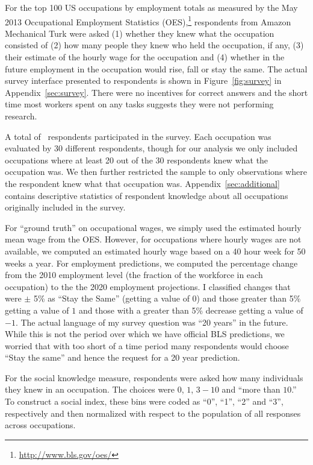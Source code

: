 \documentclass[12pt]{article}
\newcommand{\qu}[1]{``#1''}
\begin{document}
For the top 100 US occupations by employment totals as measured by the May 2013 Occupational Employment Statistics (OES),\footnote{\url{http://www.bls.gov/oes/}}  respondents from Amazon Mechanical Turk were asked
(1) whether they knew what the occupation consisted of 
(2) how many people they knew who held the occupation, if any,  
(3) their estimate of the hourly wage for the occupation
and (4) whether in the future employment in the occupation would rise, fall or stay the same.
The actual survey interface presented to respondents is shown in Figure~\ref{fig:survey} in Appendix~\ref{sec:survey}. 
There were no incentives for correct answers and the short time most workers spent on any tasks suggests they were not performing research. 

A total of \numRaters\, respondents participated in the survey. 
Each occupation was evaluated by 30 different respondents, though for our analysis we only included occupations where at least 20 out of the 30 respondents knew what the occupation was.
We then further restricted the sample to only observations where the respondent knew what that occupation was. %
Appendix~\ref{sec:additional} contains descriptive statistics of respondent knowledge about all occupations originally included in the survey.   

For ``ground truth'' on occupational wages, we simply used the estimated hourly mean wage from the OES.
However, for occupations where hourly wages are not available, we computed an estimated hourly wage based on a 40 hour week for 50 weeks a year.  
For employment predictions, we computed the percentage change from the 2010 employment level (the fraction of the workforce in each occupation) to the the 2020 employment projections. 
I classified changes that were $\pm$ 5\% as ``Stay the Same'' (getting a value of $0$) and those greater than 5\% getting a value of $1$ and those with a greater than 5\% decrease getting a value of $-1$.  
The actual language of my survey question was ``20 years'' in the future. 
While this is not the period over which we have official BLS predictions, we worried that with too short of a time period many respondents would choose ``Stay the same'' and hence the request for a 20 year prediction. %

For the social knowledge measure, respondents were asked how many individuals they knew in an occupation. 
The choices were $0$, $1$, $3-10$ and \qu{more than $10$.} 
To construct a social index, these bins were coded as ``0'', ``1'', ``2'' and ``3'', respectively and then normalized with respect to the population of all responses across occupations. 
\end{document}

